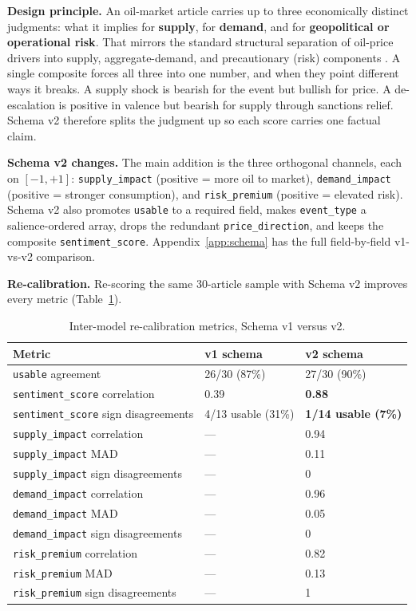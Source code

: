 \textbf{Design principle.} An oil-market article carries up to three economically distinct judgments: what it implies for \textbf{supply}, for \textbf{demand}, and for \textbf{geopolitical or operational risk}. That mirrors the standard structural separation of oil-price drivers into supply, aggregate-demand, and precautionary (risk) components \citep{kilian2009}. A single composite forces all three into one number, and when they point different ways it breaks. A supply shock is bearish for the event but bullish for price. A de-escalation is positive in valence but bearish for supply through sanctions relief. Schema v2 therefore splits the judgment up so each score carries one factual claim.

\textbf{Schema v2 changes.} The main addition is the three orthogonal channels, each on $[-1, +1]$: \texttt{supply\_impact} (positive = more oil to market), \texttt{demand\_impact} (positive = stronger consumption), and \texttt{risk\_premium} (positive = elevated risk). Schema v2 also promotes \texttt{usable} to a required field, makes \texttt{event\_type} a salience-ordered array, drops the redundant \texttt{price\_direction}, and keeps the composite \texttt{sentiment\_score}. Appendix~\ref{app:schema} has the full field-by-field v1-vs-v2 comparison.

\textbf{Re-calibration.} Re-scoring the same 30-article sample with Schema v2 improves every metric (Table~\ref{tab:recalibration}).

\begin{table}[h]
  \centering
  \caption{Inter-model re-calibration metrics, Schema v1 versus v2.}
  \label{tab:recalibration}
  \begin{tabular}{@{}lll@{}}
    \toprule
    Metric & v1 schema & v2 schema \\
    \midrule
    \texttt{usable} agreement & 26/30 (87\%) & 27/30 (90\%) \\
    \texttt{sentiment\_score} correlation & 0.39 & \textbf{0.88} \\
    \texttt{sentiment\_score} sign disagreements & 4/13 usable (31\%) & \textbf{1/14 usable (7\%)} \\
    \texttt{supply\_impact} correlation & --- & 0.94 \\
    \texttt{supply\_impact} MAD & --- & 0.11 \\
    \texttt{supply\_impact} sign disagreements & --- & 0 \\
    \texttt{demand\_impact} correlation & --- & 0.96 \\
    \texttt{demand\_impact} MAD & --- & 0.05 \\
    \texttt{demand\_impact} sign disagreements & --- & 0 \\
    \texttt{risk\_premium} correlation & --- & 0.82 \\
    \texttt{risk\_premium} MAD & --- & 0.13 \\
    \texttt{risk\_premium} sign disagreements & --- & 1 \\
    \bottomrule
  \end{tabular}
\end{table}

